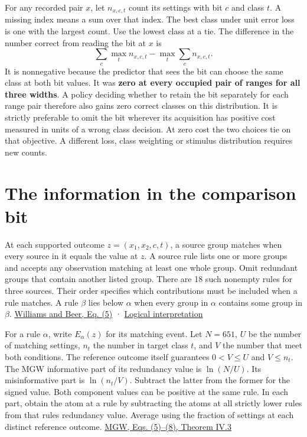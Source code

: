 For any recorded pair \(x\), let \(n_{x,c,t}\) count its settings with bit \(c\) and class \(t\). A missing index means a sum over that index. The best class under unit error loss is one with the largest count. Use the lowest class at a tie. The difference in the number correct from reading the bit at \(x\) is \[
      \sum_c\max_t n_{x,c,t}-\max_t \sum_c n_{x,c,t}.
\] It is nonnegative because the predictor that sees the bit can choose the same class at both bit values. It was \textbf{zero at every occupied pair of ranges for all three widths}. A policy deciding whether to retain the bit separately for each range pair therefore also gains zero correct classes on this distribution. It is strictly preferable to omit the bit wherever its acquisition has positive cost measured in units of a wrong class decision. At zero cost the two choices tie on that objective. A different loss, class weighting or stimulus distribution requires new counts.

\clearpage

\section{The information in the comparison bit}\label{the-information-in-the-comparison-bit}

At each supported outcome \(z=(x_1,x_2,c,t)\), a source group matches when every source in it equals the value at \(z\). A source rule lists one or more groups and accepts any observation matching at least one whole group. Omit redundant groups that contain another listed group. There are 18 such nonempty rules for three sources. Their order specifies which contributions must be included when a rule matches. A rule \(\beta\) lies below \(\alpha\) when every group in \(\alpha\) contains some group in \(\beta\). \href{https://arxiv.org/abs/1004.2515v1}{Williams and Beer, Eq. (5)} · \href{https://doi.org/10.1098/rspa.2021.0110}{Logical interpretation}

For a rule \(\alpha\), write \(E_\alpha(z)\) for its matching event. Let \(N=651\), \(U\) be the number of matching settings, \(n_t\) the number in target class \(t\), and \(V\) the number that meet both conditions. The reference outcome itself guarantees \(0<V\le U\) and \(V\le n_t\). The MGW informative part of its redundancy value is \(\ln(N/U)\). Its misinformative part is \(\ln(n_t/V)\). Subtract the latter from the former for the signed value. Both component values can be positive at the same rule. In each part, obtain the atom at a rule by subtracting the atoms at all strictly lower rules from that rule\textquotesingle s redundancy value. Average using the fraction of settings at each distinct reference outcome. \href{https://arxiv.org/abs/2002.03356v5}{MGW, Eqs. (5)--(8), Theorem IV.3}

